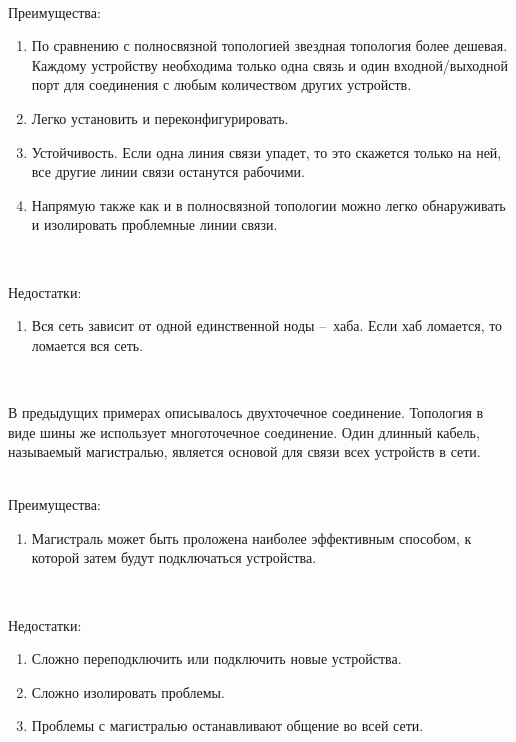 \

Преимущества: \\
\begin{enumerate}
  \item По сравнению с полносвязной топологией звездная топология более дешевая. Каждому устройству необходима только одна связь и один входной/выходной порт для соединения с любым количеством других устройств.
  \item Легко установить и переконфигурировать.
  \item Устойчивость. Если одна линия связи упадет, то это скажется только на ней, все другие линии связи останутся рабочими.
  \item Напрямую также как и в полносвязной топологии можно легко обнаруживать и изолировать проблемные линии связи.
\end{enumerate}
\

Недостатки: \\
\begin{enumerate}
  \item Вся сеть зависит от одной единственной ноды – хаба. Если хаб ломается, то ломается вся сеть. 
\end{enumerate}
\

В предыдущих примерах описывалось двухточечное соединение. Топология в виде шины же использует многоточечное соединение. Один длинный кабель, называемый магистралью, является основой для связи всех устройств в сети. \\

\

Преимущества: \\
\begin{enumerate}
  \item Магистраль может быть проложена наиболее эффективным способом, к которой затем будут подключаться устройства.
\end{enumerate}
\

Недостатки: \\
\begin{enumerate}
  \item Сложно переподключить или подключить новые устройства.
  \item Сложно изолировать проблемы.
  \item Проблемы с магистралью останавливают общение во всей сети.
\end{enumerate}
\

